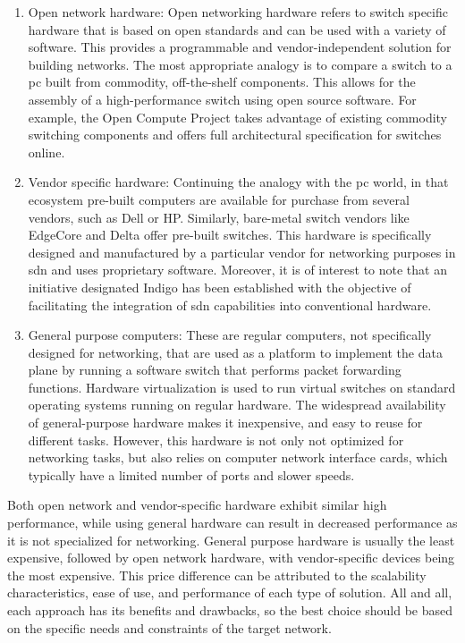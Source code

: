 \begin{enumerate}
\item Open network hardware: 
    Open networking hardware refers to switch specific hardware that is based on open standards and can be used with a variety of software. This provides a programmable and vendor-independent solution for building networks. The most appropriate analogy is to compare a switch to a \gls{pc} built from commodity, off-the-shelf components. This allows for the assembly of a high-performance switch\cite{peterson_software-defined_2021} using open source software. For example, the Open Compute Project takes advantage of existing commodity switching components and offers full architectural specification for switches online\cite{noauthor_open_nodate-1}.   

\item Vendor specific hardware:
    Continuing the analogy with the \gls{pc} world, in that ecosystem pre-built computers are available for purchase from several vendors, such as Dell or HP. Similarly, bare-metal switch vendors like EdgeCore and Delta offer pre-built switches\cite{peterson_software-defined_2021}. This hardware is specifically designed and manufactured by a particular vendor for networking purposes in \gls{sdn} and uses proprietary software. Moreover, it is of interest to note that an initiative designated Indigo\cite{noauthor_indigo_nodate} has been established with the objective of facilitating the integration of \gls{sdn} capabilities into conventional hardware.

\item General purpose computers:
    These are regular computers, not specifically designed for networking, that are used as a platform to implement the data plane by running a software switch that performs packet forwarding functions. Hardware virtualization is used to run virtual switches on standard operating systems running on regular hardware. The widespread availability of general-purpose hardware makes it inexpensive, and easy to reuse for different tasks. However, this hardware is not only not optimized for networking tasks, but also relies on computer network interface cards, which typically have a limited number of ports and slower speeds.
\end{enumerate}

Both open network and vendor-specific hardware exhibit similar high performance, while using general hardware can result in decreased performance as it is not specialized for networking. General purpose hardware is usually the least expensive, followed by open network hardware, with vendor-specific devices being the most expensive. This price difference can be attributed to the scalability characteristics, ease of use, and performance of each type of solution. All and all, each approach has its benefits and drawbacks, so the best choice should be based on the specific needs and constraints of the target network.

